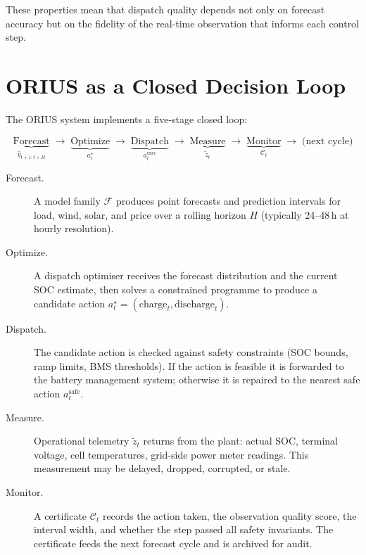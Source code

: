 These properties mean that dispatch quality depends not only on forecast
accuracy but on the fidelity of the real-time observation that informs each
control step.

\section{ORIUS as a Closed Decision Loop}

The ORIUS system implements a five-stage closed loop:

\[
  \underbrace{\text{Forecast}}_{\hat{y}_{t+1:t+H}}
  \;\longrightarrow\;
  \underbrace{\text{Optimize}}_{a_t^\star}
  \;\longrightarrow\;
  \underbrace{\text{Dispatch}}_{a_t^{\mathrm{exec}}}
  \;\longrightarrow\;
  \underbrace{\text{Measure}}_{\tilde{z}_t}
  \;\longrightarrow\;
  \underbrace{\text{Monitor}}_{\mathcal{C}_t}
  \;\longrightarrow\;
  \text{(next cycle)}
\]

\begin{description}
  \item[Forecast.]  A model family $\mathcal{F}$ produces point forecasts and
    prediction intervals for load, wind, solar, and price over a rolling
    horizon $H$ (typically 24--48\,h at hourly resolution).

  \item[Optimize.]  A dispatch optimiser receives the forecast distribution
    and the current SOC estimate, then solves a constrained programme to
    produce a candidate action $a_t^\star = (\text{charge}_t,
    \text{discharge}_t)$.

  \item[Dispatch.]  The candidate action is checked against safety constraints
    (SOC bounds, ramp limits, BMS thresholds).  If the action is feasible it
    is forwarded to the battery management system; otherwise it is repaired to
    the nearest safe action $a_t^{\mathrm{safe}}$.

  \item[Measure.]  Operational telemetry $\tilde{z}_t$ returns from the plant:
    actual SOC, terminal voltage, cell temperatures, grid-side power meter
    readings.  This measurement may be delayed, dropped, corrupted, or stale.

  \item[Monitor.]  A certificate $\mathcal{C}_t$ records the action taken, the
    observation quality score, the interval width, and whether the step passed
    all safety invariants.  The certificate feeds the next forecast cycle and
    is archived for audit.
\end{description}

